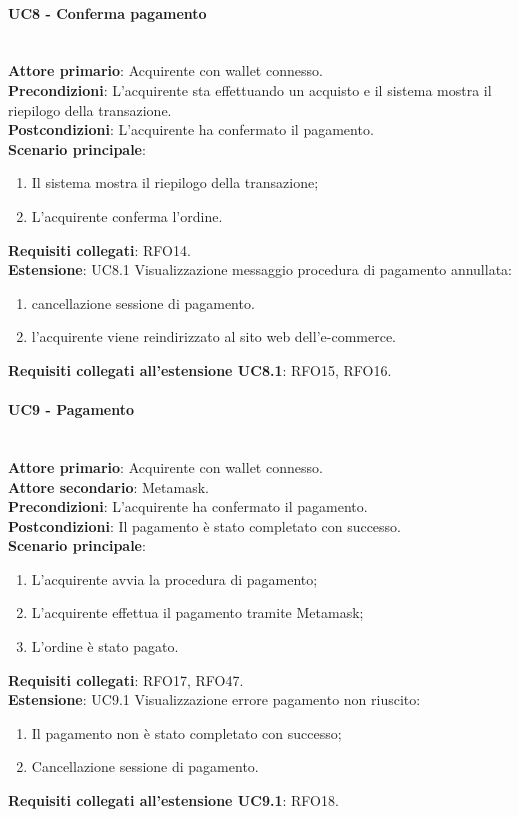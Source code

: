 \documentclass[a4paper, 12pt]{article}
\begin{document}
\paragraph{UC8 - Conferma pagamento}\\
\textbf{Attore primario}: Acquirente con wallet connesso.\\
\textbf{Precondizioni}: L'acquirente sta effettuando un acquisto e il sistema mostra il riepilogo della transazione.\\
\textbf{Postcondizioni}: L'acquirente ha confermato il pagamento.\\
\textbf{Scenario principale}:
\begin{enumerate}
    \item Il sistema mostra il riepilogo della transazione;
    \item L'acquirente conferma l'ordine.
\end{enumerate}
\textbf{Requisiti collegati}: RFO14.\\
\textbf{Estensione}:
UC8.1 Visualizzazione messaggio procedura di pagamento annullata:
\begin{enumerate}
    \item cancellazione sessione di pagamento.
    \item l'acquirente viene reindirizzato al sito web dell'e-commerce.
\end{enumerate}
\textbf{Requisiti collegati all'estensione UC8.1}: RFO15, RFO16.

\paragraph{UC9 - Pagamento}\\
\textbf{Attore primario}: Acquirente con wallet connesso.\\
\textbf{Attore secondario}: Metamask.\\
\textbf{Precondizioni}: L'acquirente ha confermato il pagamento.\\
\textbf{Postcondizioni}: Il pagamento è stato completato con successo.\\
\textbf{Scenario principale}:
\begin{enumerate}
    \item L'acquirente avvia la procedura di pagamento;
    \item L'acquirente effettua il pagamento tramite Metamask;
    \item L'ordine è stato pagato.
\end{enumerate}
\textbf{Requisiti collegati}: RFO17, RFO47.\\
\textbf{Estensione}:
UC9.1 Visualizzazione errore pagamento non riuscito:
\begin{enumerate}
    \item Il pagamento non è stato completato con successo;
    \item Cancellazione sessione di pagamento.
\end{enumerate}
\textbf{Requisiti collegati all'estensione UC9.1}: RFO18.
\end{document}
